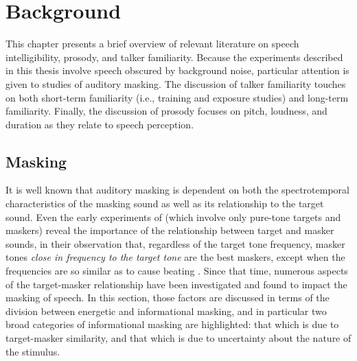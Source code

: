 \chapter{Background}
This chapter presents a brief overview of relevant literature on speech intelligibility, prosody, and talker familiarity.  Because the experiments described in this thesis involve speech obscured by background noise, particular attention is given to studies of auditory masking.  The discussion of talker familiarity touches on both short-term familiarity (i.e., training and exposure studies) and long-term familiarity.  Finally, the discussion of prosody focuses on pitch, loudness, and duration as they relate to speech perception.

\section{Masking}
It is well known that auditory masking is dependent on both the spectrotemporal characteristics of the masking sound as well as its relationship to the target sound.  %
Even the early experiments of \citeauthor{WegelLane1924} (which involve only pure-tone targets and maskers) reveal the importance of the relationship between target and masker sounds, in their observation that, regardless of the target tone frequency, masker tones \emph{close in frequency to the target tone} are the best maskers, except when the frequencies are so similar as to cause beating \citep{WegelLane1924}.  Since that time, numerous aspects of the target-masker relationship have been investigated and found to impact the masking of speech.  In this section, those factors are discussed %
in terms of the division between energetic and informational masking, and in particular two broad categories of informational masking are highlighted: that which is due to target-masker similarity, and that which is due to uncertainty about the nature of the stimulus.

